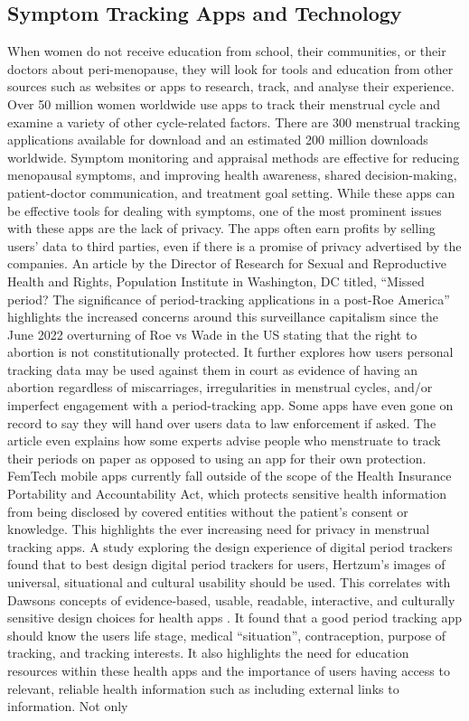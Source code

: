 \subsection{Symptom Tracking Apps and Technology}
When women do not receive education from school, their communities, or their doctors about peri-menopause, they will look for tools and education from other sources such as websites or apps to research, track, and analyse their experience. Over 50 million women worldwide use apps to track their menstrual cycle and examine a variety of other cycle-related factors\cite{Kelly2023}. There are 300 menstrual tracking applications available for download and an estimated 200 million downloads worldwide\cite{Eschler2019}. Symptom monitoring and appraisal methods are effective for reducing menopausal symptoms, and improving health awareness, shared decision-making, patient-doctor communication, and treatment goal setting\cite{Andrews2021}. While these apps can be effective tools for dealing with symptoms, one of the most prominent issues with these apps are the lack of privacy. The apps often earn profits by selling users’ data to third parties, even if there is a promise of privacy advertised by the companies\cite{Gilman2021}. An article by the Director of Research for Sexual and Reproductive Health and Rights, Population Institute in Washington, DC titled, “Missed period? The significance of period-tracking applications in a post-Roe America” highlights the increased concerns around this surveillance capitalism since the June 2022 overturning of Roe vs Wade in the US stating that the right to abortion is not constitutionally protected\cite{CoenSanchez2022}. It further explores how users personal tracking data may be used against them in court as evidence of having an abortion regardless of miscarriages, irregularities in menstrual cycles, and/or imperfect engagement with a period-tracking app. Some apps have even gone on record to say they will hand over users data to law enforcement if asked. The article even explains how some experts advise people who menstruate to track their periods on paper as opposed to using an app for their own protection. FemTech mobile apps currently fall outside of the scope of the Health Insurance Portability and Accountability Act, which protects sensitive health information from being disclosed by covered entities without the patient’s consent or knowledge\cite{OCR2022}. This highlights the ever increasing need for privacy in menstrual tracking apps. A study\cite{Chan2019} exploring the design experience of digital period trackers found that to best design digital period trackers for users, Hertzum’s images of universal, situational and cultural usability should be used. This correlates with Dawsons concepts of evidence-based, usable, readable, interactive, and culturally sensitive design choices for health apps \cite{Dawson2020}. It found that a good period tracking app should know the users life stage, medical “situation”, contraception, purpose of tracking, and tracking interests. It also highlights the need for education resources within these health apps and the importance of users having access to relevant, reliable health information such as including external links to information. Not only 